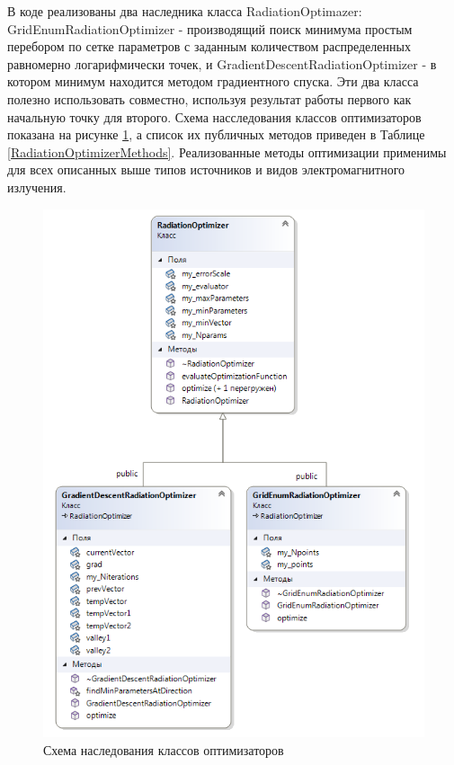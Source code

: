 В коде реализованы два наследника класса RadiationOptimazer: GridEnumRadiationOptimizer - производящий поиск минимума простым перебором по сетке параметров с заданным количеством распределенных равномерно логарифмически точек, и GradientDescentRadiationOptimizer - в котором минимум находится методом градиентного спуска. Эти два класса полезно использовать совместно, используя результат работы первого как начальную точку для второго. Схема насследования классов оптимизаторов показана на рисунке \ref{radiationOptimizer}, а список их публичных методов приведен в Таблице \ref{RadiationOptimizerMethods}. Реализованные методы оптимизации применимы для всех описанных выше типов источников и видов электромагнитного излучения.
\begin{figure}
	\centering
	\includegraphics[width=11.5 cm]{./fig/radiationOptimizer.png} 
	\caption{Схема наследования классов оптимизаторов}
	\label{radiationOptimizer}
\end{figure}

